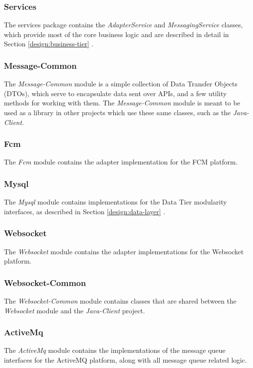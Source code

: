 \subsubsection*{Services}
The services package contains the \textit{AdapterService} and \textit{MessagingService} classes, which provide most of the core business logic and are described in detail in Section \ref{design:business-tier} .

\subsubsection{Message-Common}
The \textit{Message-Common} module is a simple collection of Data Transfer Objects (DTOs), which serve to encapsulate data sent over APIs, and a few utility methods for working with them. The \textit{Message-Common} module is meant to be used as a library in other projects which use these same classes, such as the \textit{Java-Client}.

\subsubsection{Fcm}
The \textit{Fcm} module contains the adapter implementation for the FCM platform.

\subsubsection{Mysql}
The \textit{Mysql} module contains implementations for the Data Tier modularity interfaces, as described in Section \ref{design:data-layer} .

\subsubsection{Websocket}
The \textit{Websocket} module contains the adapter implementations for the Websocket platform.

\subsubsection{Websocket-Common}
The \textit{Websocket-Common} module contains classes that are shared between the \textit{Websocket} module and the \textit{Java-Client} project.

\subsubsection{ActiveMq}
The \textit{ActiveMq} module contains the implementations of the message queue interfaces for the ActiveMQ platform, along with all message queue related logic.

